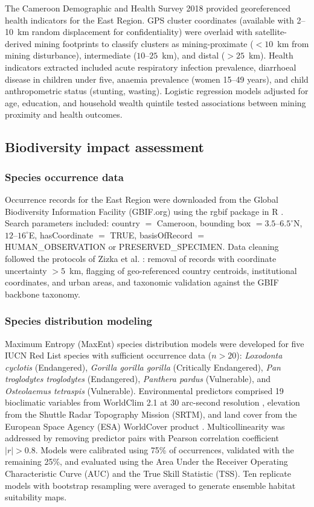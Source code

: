 \documentclass[preprint,12pt,authoryear]{elsarticle}
\begin{document}
The Cameroon Demographic and Health Survey 2018 \citep{INS2019} provided georeferenced health indicators for the East Region. GPS cluster coordinates (available with 2--10~km random displacement for confidentiality) were overlaid with satellite-derived mining footprints to classify clusters as mining-proximate ($< 10$~km from mining disturbance), intermediate ($10$--$25$~km), and distal ($> 25$~km). Health indicators extracted included acute respiratory infection prevalence, diarrhoeal disease in children under five, anaemia prevalence (women 15--49 years), and child anthropometric status (stunting, wasting). Logistic regression models adjusted for age, education, and household wealth quintile tested associations between mining proximity and health outcomes.


\subsection{Biodiversity impact assessment}

\subsubsection{Species occurrence data}

Occurrence records for the East Region were downloaded from the Global Biodiversity Information Facility (GBIF.org) using the rgbif package in R \citep{Chamberlain2024}. Search parameters included: country $=$ Cameroon, bounding box $= 3.5$--$6.5^{\circ}$N, $12$--$16^{\circ}$E, hasCoordinate $=$ TRUE, basisOfRecord $=$ HUMAN\_OBSERVATION or PRESERVED\_SPECIMEN. Data cleaning followed the protocols of Zizka et al. \citep{Zizka2019}: removal of records with coordinate uncertainty $> 5$~km, flagging of geo-referenced country centroids, institutional coordinates, and urban areas, and taxonomic validation against the GBIF backbone taxonomy.

\subsubsection{Species distribution modeling}

Maximum Entropy (MaxEnt) species distribution models \citep{Phillips2006} were developed for five IUCN Red List species with sufficient occurrence data ($n > 20$): \textit{Loxodonta cyclotis} (Endangered), \textit{Gorilla gorilla gorilla} (Critically Endangered), \textit{Pan troglodytes troglodytes} (Endangered), \textit{Panthera pardus} (Vulnerable), and \textit{Osteolaemus tetraspis} (Vulnerable). Environmental predictors comprised 19 bioclimatic variables from WorldClim 2.1 at 30 arc-second resolution \citep{Fick2017}, elevation from the Shuttle Radar Topography Mission (SRTM), and land cover from the European Space Agency (ESA) WorldCover product \citep{Zanaga2021}. Multicollinearity was addressed by removing predictor pairs with Pearson correlation coefficient $|r| > 0.8$. Models were calibrated using 75\% of occurrences, validated with the remaining 25\%, and evaluated using the Area Under the Receiver Operating Characteristic Curve (AUC) and the True Skill Statistic (TSS). Ten replicate models with bootstrap resampling were averaged to generate ensemble habitat suitability maps.
\end{document}
